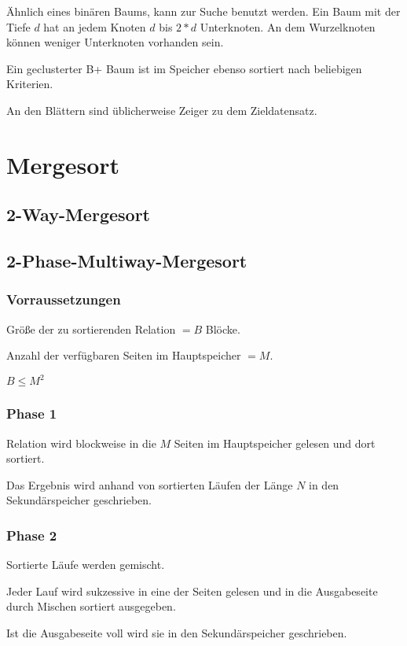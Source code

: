 \documentclass[10pt,a4paper,oneside]{report}
\begin{document}
Ähnlich eines binären Baums, kann zur Suche benutzt werden. Ein Baum mit der Tiefe $d$ hat an jedem Knoten $d$ bis $2*d$ Unterknoten. An dem Wurzelknoten können weniger Unterknoten vorhanden sein.

Ein geclusterter B+ Baum ist im Speicher ebenso sortiert nach beliebigen Kriterien.

An den Blättern sind üblicherweise Zeiger zu dem Zieldatensatz.

\section*{Mergesort}

\subsection*{2-Way-Mergesort}

\subsection*{2-Phase-Multiway-Mergesort}

\subsubsection*{Vorraussetzungen}

Größe der zu sortierenden Relation $= B$ Blöcke.

Anzahl der verfügbaren Seiten im Hauptspeicher $= M$.

$B \leq M^2$

\subsubsection*{Phase 1}

Relation wird blockweise in die $M$ Seiten im Hauptspeicher gelesen und dort sortiert.

Das Ergebnis wird anhand von sortierten Läufen der Länge $N$ in den Sekundärspeicher geschrieben.

\subsubsection*{Phase 2}

Sortierte Läufe werden gemischt.

Jeder Lauf wird sukzessive in eine der Seiten gelesen und in die Ausgabeseite durch Mischen sortiert ausgegeben.

Ist die Ausgabeseite voll wird sie in den Sekundärspeicher geschrieben.
\end{document}

